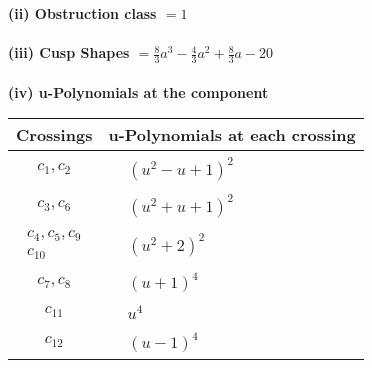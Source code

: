 \documentclass[1p]{elsarticle_modified}
\theoremstyle{definition}
\begin{document}
\flushleft \textbf{(ii) Obstruction class $= 1$}\\~\\
\flushleft \textbf{(iii) Cusp Shapes $= \frac{8}{3} a^3-\frac{4}{3} a^2+\frac{8}{3} a-20$}\\~\\
\newpage\renewcommand{\arraystretch}{1}
\flushleft \textbf{(iv) u-Polynomials at the component}\newline \\
\begin{tabular}{m{50pt}|m{274pt}}
Crossings & \hspace{64pt}u-Polynomials at each crossing \\
\hline $$\begin{aligned}c_{1},c_{2}\end{aligned}$$&$\begin{aligned}
&(u^2- u+1)^2
\end{aligned}$\\
\hline $$\begin{aligned}c_{3},c_{6}\end{aligned}$$&$\begin{aligned}
&(u^2+u+1)^2
\end{aligned}$\\
\hline $$\begin{aligned}c_{4},c_{5},c_{9}\\c_{10}\end{aligned}$$&$\begin{aligned}
&(u^2+2)^2
\end{aligned}$\\
\hline $$\begin{aligned}c_{7},c_{8}\end{aligned}$$&$\begin{aligned}
&(u+1)^4
\end{aligned}$\\
\hline $$\begin{aligned}c_{11}\end{aligned}$$&$\begin{aligned}
&u^4
\end{aligned}$\\
\hline $$\begin{aligned}c_{12}\end{aligned}$$&$\begin{aligned}
&(u-1)^4
\end{aligned}$\\
\hline
\end{tabular}\\~\\
\end{document}
